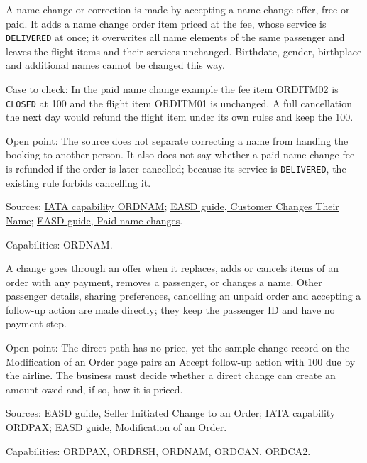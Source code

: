 \begin{definition}
  \label{def:change-cancellation-name-change}
  \notready
  A name change or correction is made by accepting a name change offer, free
  or paid. It adds a name change order item priced at the fee, whose service
  is \texttt{DELIVERED} at once; it overwrites all name elements of the same
  passenger and leaves the flight items and their services unchanged.
  Birthdate, gender, birthplace and additional names cannot be changed this
  way.

  Case to check: In the paid name change example the fee item ORDITM02 is
  \texttt{CLOSED} at 100 and the flight item ORDITM01 is unchanged. A full
  cancellation the next day would refund the flight item under its own rules
  and keep the 100.

  Open point: The source does not separate correcting a name from handing
  the booking to another person. It also does not say whether a paid name
  change fee is refunded if the order is later cancelled; because its
  service is \texttt{DELIVERED}, the existing rule forbids cancelling it.

  Sources: \href{https://retailing.iata.org/armi/docs/ORDNAM/}{IATA capability ORDNAM};
  \href{https://standards.atlassian.net/wiki/spaces/EASD/pages/672825346}{EASD guide, Customer Changes Their Name};
  \href{https://standards.atlassian.net/wiki/spaces/EASD/pages/672792581}{EASD guide, Paid name changes}.

  Capabilities: ORDNAM.
\end{definition}

\begin{definition}
  \label{def:change-cancellation-no-offer-changes}
  \notready
  A change goes through an offer when it replaces, adds or cancels items of
  an order with any payment, removes a passenger, or changes a name. Other
  passenger details, sharing preferences, cancelling an unpaid order and
  accepting a follow-up action are made directly; they keep the passenger ID
  and have no payment step.

  Open point: The direct path has no price, yet the sample change record on
  the Modification of an Order page pairs an Accept follow-up action with
  100 due by the airline. The business must decide whether a direct change
  can create an amount owed and, if so, how it is priced.

  Sources: \href{https://standards.atlassian.net/wiki/spaces/EASD/pages/574554168}{EASD guide, Seller Initiated Change to an Order};
  \href{https://retailing.iata.org/armi/docs/ORDPAX/}{IATA capability ORDPAX};
  \href{https://standards.atlassian.net/wiki/spaces/EASD/pages/574619782}{EASD guide, Modification of an Order}.

  Capabilities: ORDPAX, ORDRSH, ORDNAM, ORDCAN, ORDCA2.
\end{definition}

